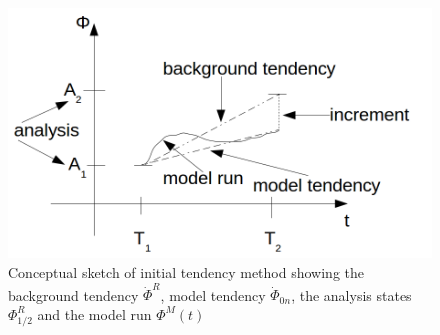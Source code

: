\documentclass[a4paper,12pt,twoside]{scrreprt}
\numberwithin{equation}{chapter}
\newcommand{\p}{\par}
\begin{document}
\p
\FloatBarrier
\begin{figure}
\includegraphics[scale=0.9]{./img/sketch2.png} 
\caption{Conceptual sketch of initial tendency method showing the background tendency $\dot{\Phi}^R$, model tendency $\dot{\Phi}_{0n}$, the analysis states $\Phi^R_{1/2}$ and the model run $\Phi^M(t)$}
\label{fig:1}
\end{figure}
\end{document}
